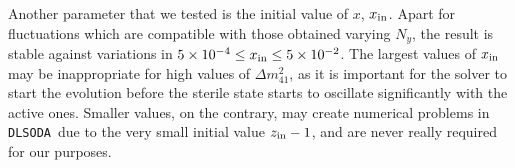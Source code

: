 \documentclass[notitlepage,showpacs,preprintnumbers,amsmath,amssymb,superscriptaddress,prd,onecolumn]{revtex4-1}
\newcommand{\dmsq}[1]{\ensuremath{\Delta m^2_{#1}}}
\newcommand{\e}[1]{\ensuremath{\times10^{#1}}}
\newcommand{\dlsoda}{\texttt{DLSODA}}
\begin{document}
Another parameter that we tested is the initial value of $x$, $x_{\rm in}$.
Apart for fluctuations which are compatible with those obtained varying $N_y$,
the result is stable against variations in $5\e{-4}\leq x_{\rm in}\leq5\e{-2}$.
The largest values of $x_{\rm in}$ may be inappropriate for high values of \dmsq{41},
as it is important for the solver to start the evolution before the sterile state
starts to oscillate significantly with the active ones.
Smaller values, on the contrary, may create numerical problems in \dlsoda\
due to the very small initial value $z_{\rm in}-1$,
and are never really required for our purposes.




\end{document}
